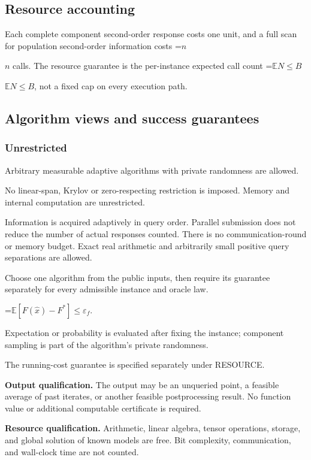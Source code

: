 \documentclass[10pt,a4paper]{article}
\newcommand{\AtlasMath}[1]{\par\begingroup\centering\setbox0=\hbox{$\displaystyle #1$}\ifdim\wd0>1.4\linewidth\typeout{ATLAS WIDE FORMULA: \the\wd0}\fi\ifdim\wd0>\linewidth\resizebox{\linewidth}{!}{\box0}\else\box0\fi\par\endgroup}
\newcommand{\AtlasInlineMath}[1]{\begingroup\setbox0=\hbox{$#1$}\ifdim\wd0>.4\linewidth\endgroup\AtlasMath{#1}\else\endgroup$#1$\fi}
\begin{document}
\subsection{Resource accounting}
Each complete component second-order response costs one unit, and a full scan for population second-order information costs \AtlasInlineMath{n} calls. The resource guarantee is the per-instance expected call count \AtlasInlineMath{\mathbb{E}N\le B}, not a fixed cap on every execution path.

\subsection{Algorithm views and success guarantees}
\subsubsection{Unrestricted}
Arbitrary measurable adaptive algorithms with private randomness are allowed.

No linear-span, Krylov or zero-respecting restriction is imposed. Memory and internal computation are unrestricted.

Information is acquired adaptively in query order. Parallel submission does not reduce the number of actual responses counted. There is no communication-round or memory budget. Exact real arithmetic and arbitrarily small positive query separations are allowed.

Choose one algorithm from the public inputs, then require its guarantee separately for every admissible instance and oracle law.


\AtlasMath{\mathbb{E}\!\left[F(\widehat{x})-F^*\right]\le \varepsilon_f.}


Expectation or probability is evaluated after fixing the instance; component sampling is part of the algorithm's private randomness.

The running-cost guarantee is specified separately under RESOURCE.

\textbf{Output qualification.} The output may be an unqueried point, a feasible average of past iterates, or another feasible postprocessing result. No function value or additional computable certificate is required.

\textbf{Resource qualification.} Arithmetic, linear algebra, tensor operations, storage, and global solution of known models are free. Bit complexity, communication, and wall-clock time are not counted.
\end{document}
